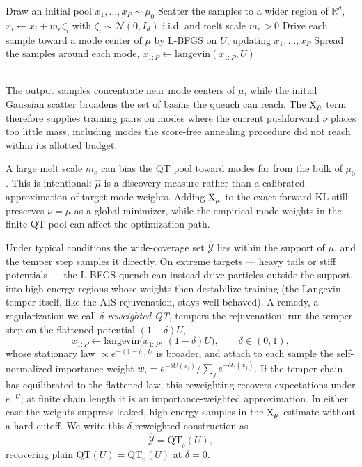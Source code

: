 \documentclass{article}
\begin{document}
\begin{algorithm}[htb]
\caption{Quench and temper (QT): proactive mode discovery}
\label{alg: QT}
Draw an initial pool $x_1,\dots,x_P \sim \mu_0$\;
Scatter the samples to a wider region of $\mathbb R^d$, $x_i \gets x_i + m_e\zeta_i$ with $\zeta_i \sim \mathcal N(0, I_d)$ i.i.d. and melt scale $m_e > 0$\;
Drive each sample toward a mode center of $\mu$ by L-BFGS on $U$, updating $x_1,\dots,x_P$\;
Spread the samples around each mode, $x_{1:P} \gets \mathrm{langevin}(x_{1:P}, U)$\;
\end{algorithm}
\mbox{}\\
The output samples concentrate near mode centers of $\mu$, while the initial Gaussian scatter broadens the set of basins the quench can reach. The $\mathrm{X}_{\hat\mu}$ term therefore supplies training pairs on modes where the current pushforward $\nu$ places too little mass, including modes the score-free annealing procedure did not reach within its allotted budget.

A large melt scale $m_e$ can bias the QT pool toward modes far from the bulk of $\mu_0$. This is intentional: $\hat\mu$ is a discovery measure rather than a calibrated approximation of target mode weights. Adding $\mathrm{X}_{\hat\mu}$ to the exact forward KL still preserves $\nu=\mu$ as a global minimizer, while the empirical mode weights in the finite QT pool can affect the optimization path.

Under typical conditions the wide-coverage set $\hat{\mathcal Y}$ lies within the support of $\mu$, and the temper step samples it directly. On extreme targets --- heavy tails or stiff potentials --- the L-BFGS quench can instead drive particles outside the support, into high-energy regions whose weights then destabilize training (the Langevin temper itself, like the AIS rejuvenation, stays well behaved). A remedy, a regularization we call \emph{$\delta$-reweighted QT}, tempers the rejuvenation: run the temper step on the flattened potential $(1-\delta) U$,
\begin{equation*}
    x_{1:P} \gets \mathrm{langevin}\bigl(x_{1:P},\, (1-\delta) U\bigr),
    \qquad \delta \in (0, 1),
\end{equation*}
whose stationary law $\propto e^{-(1-\delta)U}$ is broader, and attach to each sample the self-normalized importance weight $w_i = e^{-\delta U(x_i)} / \sum_{j} e^{-\delta U(x_j)}$. If the temper chain has equilibrated to the flattened law, this reweighting recovers expectations under $e^{-U}$; at finite chain length it is an importance-weighted approximation. In either case the weights suppress leaked, high-energy samples in the $\mathrm{X}_{\hat\mu}$ estimate without a hard cutoff. We write this $\delta$-reweighted construction as
\begin{equation*}
    \hat{\mathcal Y} = \mathrm{QT}_\delta(U),
\end{equation*}
recovering plain $\mathrm{QT}(U) = \mathrm{QT}_0(U)$ at $\delta = 0$.
\end{document}
